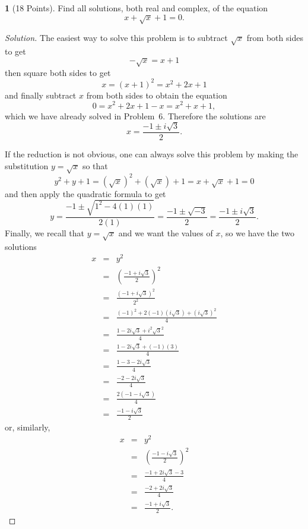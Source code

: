 \documentclass[12pt]{amsart}
\theoremstyle{definition}
\newtheorem{thm}{}
\theoremstyle{definition}
\begin{document}
\begin{thm}[18 Points]\label{ex9}
  Find all solutions, both real and complex, of the equation
  $$x + \sqrt{x} + 1 = 0.$$
  \begin{proof}[Solution]
    The easiest way to solve this problem is to subtract $\sqrt{x}$ from both sides to get
    $$-\sqrt{x} = x + 1$$
    then square both sides to get
    $$x = (x + 1)^2 = x^2 + 2x + 1$$
    and finally subtract $x$ from both sides to obtain the equation
    $$0 = x^2 + 2x + 1 - x = x^2 + x + 1,$$
    which we have already solved in Problem~6.
    Therefore the solutions are
    $$x = \frac{-1 \pm i\sqrt{3}}{2}.$$
    
    If the reduction is not obvious, one can always solve this problem by making the substitution $y = \sqrt{x}$ so that
    $$y^2 + y + 1 = (\sqrt{x})^2 + (\sqrt{x}) + 1 = x + \sqrt{x} + 1 = 0$$
    and then apply the quadratic formula to get
    $$y = \frac{-1 \pm \sqrt{1^2 - 4(1)(1)}}{2(1)} = \frac{-1 \pm \sqrt{-3}}{2} = \frac{-1 \pm i\sqrt{3}}{2}.$$
    Finally, we recall that $y = \sqrt{x}$ and we want the values of $x$, so we have the two solutions
    \begin{eqnarray*}
      x &=& y^2\\
      &=& \left(\frac{-1 + i\sqrt{3}}{2}\right)^2\\
      &=& \frac{\left(-1 + i\sqrt{3}\right)^2}{2^2}\\
      &=& \frac{(-1)^2 + 2(-1)(i\sqrt{3}) + (i\sqrt{3})^2}{4}\\
      &=& \frac{1 - 2i\sqrt{3} + i^2\sqrt{3}^2}{4}\\
      &=& \frac{1 - 2i\sqrt{3} + (-1)(3)}{4}\\
      &=& \frac{1 - 3 - 2i\sqrt{3}}{4}\\
      &=& \frac{-2 - 2i\sqrt{3}}{4}\\
      &=& \frac{2(-1 - i\sqrt{3})}{4}\\
      &=& \frac{-1 - i\sqrt{3}}{2}
    \end{eqnarray*}
    or, similarly,
    \begin{eqnarray*}
      x &=& y^2\\
      &=& \left(\frac{-1 - i\sqrt{3}}{2}\right)^2\\
      &=& \frac{-1 + 2i\sqrt{3} - 3}{4}\\
      &=& \frac{-2 + 2i\sqrt{3}}{4}\\
      &=& \frac{-1 + i\sqrt{3}}{2}.
    \end{eqnarray*}
  \end{proof}
\end{thm}
\end{document}
